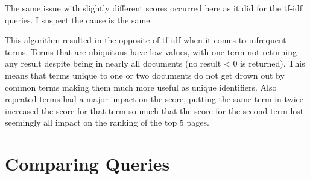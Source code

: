 \documentclass[12pt, letterpaper]{article}
\begin{document}
The same issue with slightly different scores occurred here as it did for the tf-idf queries. I suspect the cause is the same.

This algorithm resulted in the opposite of tf-idf when it comes to infrequent terms. Terms that are ubiquitous have low values, with one term not returning any result despite being in nearly all documents (no result < 0 is returned). This means that terms unique to one or two documents do not get drown out by common terms making them much more useful as unique identifiers. Also repeated terms had a major impact on the score, putting the same term in twice increased the score for that term so much that the score for the second term lost seemingly all impact on the ranking of the top 5 pages.

\section{Comparing Queries}
\end{document}
